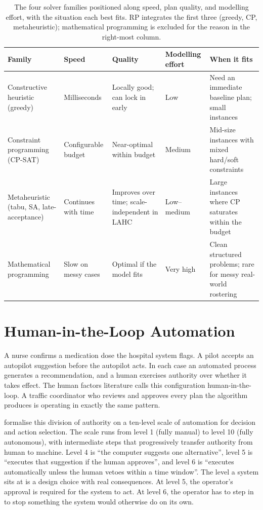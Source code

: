 \begin{table}[h]
    \centering
    \caption{The four solver families positioned along speed, plan quality, and modelling effort, with the situation each best fits. RP integrates the first three (greedy, CP, metaheuristic); mathematical programming is excluded for the reason in the right-most column.}
    \label{tab:solver-families}
    \small
    \begin{tabular}{p{}p{}p{}p{}p{}}
        \toprule
        \textbf{Family} & \textbf{Speed} & \textbf{Quality} & \textbf{Modelling effort} & \textbf{When it fits} \\
        \midrule
        Constructive heuristic (greedy)         & Milliseconds          & Locally good; can lock in early                & Low         & Need an immediate baseline plan; small instances \\
        Constraint programming (CP-SAT)         & Configurable budget   & Near-optimal within budget                     & Medium      & Mid-size instances with mixed hard/soft constraints \\
        Metaheuristic (tabu, SA, late-acceptance) & Continues with time & Improves over time; scale-independent in LAHC & Low--medium & Large instances where CP saturates within the budget \\
        Mathematical programming                & Slow on messy cases   & Optimal if the model fits                      & Very high   & Clean structured problems; rare for messy real-world rostering \\
        \bottomrule
    \end{tabular}
\end{table}


\section{Human-in-the-Loop Automation}
\label{sec:hitl}

A nurse confirms a medication dose the hospital system flags. A pilot accepts an autopilot suggestion before the autopilot acts. In each case an automated process generates a recommendation, and a human exercises authority over whether it takes effect. The human factors literature calls this configuration human-in-the-loop. A traffic coordinator who reviews and approves every plan the algorithm produces is operating in exactly the same pattern.

\textcite{parasuraman2000automation} formalise this division of authority on a ten-level scale of automation for decision and action selection. The scale runs from level 1 (fully manual) to level 10 (fully autonomous), with intermediate steps that progressively transfer authority from human to machine. Level 4 is ``the computer suggests one alternative'', level 5 is ``executes that suggestion if the human approves'', and level 6 is ``executes automatically unless the human vetoes within a time window''. The level a system sits at is a design choice with real consequences. At level 5, the operator's approval is required for the system to act. At level 6, the operator has to step in to stop something the system would otherwise do on its own.

